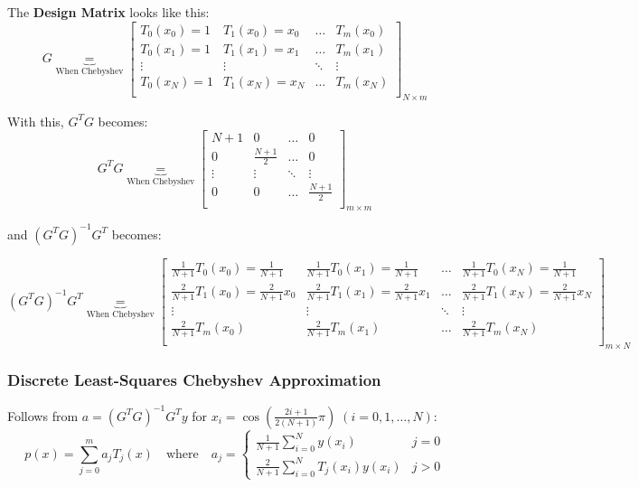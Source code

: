 \newpage

The \textbf{Design Matrix} looks like this:
$$G \underbrace{=}_{\text{When Chebyshev}}
\begin{bmatrix}
  T_0(x_0) = 1 & T_1(x_0) = x_0 & \ldots & T_m(x_0) \\
  T_0(x_1) = 1 & T_1(x_1) = x_1 & \ldots & T_m(x_1)\\
  \vdots & \vdots  & \ddots & \vdots\\
  T_0(x_N) = 1 & T_1(x_N) =x_N & \ldots & T_m(x_N)\\
\end{bmatrix}_{N \times m}$$

With this, $G^T G$ becomes:
$$G^T G \underbrace{=}_{\text{When Chebyshev}}
\begin{bmatrix}
  N+1 & 0 & \ldots & 0 \\
  0   & \frac{N+1}{2} & \ldots & 0\\
  \vdots  & \vdots & \ddots & \vdots\\
  0   & 0 & \ldots & \frac{N+1}{2}\\
\end{bmatrix}_{m \times m}$$

and $(G^T G)^{-1} G^T$ becomes:

$$(G^T G)^{-1} G^T \underbrace{=}_{\text{When Chebyshev}}
\begin{bmatrix}
  \frac{1}{N+1} T_0(x_0) = \frac{1}{N+1} & \frac{1}{N+1} T_0(x_1) = \frac{1}{N+1} & \ldots & \frac{1}{N+1} T_0(x_N) = \frac{1}{N+1} \\
  \frac{2}{N+1} T_1(x_0) = \frac{2}{N+1} x_0 & \frac{2}{N+1} T_1(x_1) = \frac{2}{N+1} x_1 & \ldots & \frac{2}{N+1} T_1(x_N) = \frac{2}{N+1}x_N\\
  \vdots & \vdots  & \ddots & \vdots\\
  \frac{2}{N+1} T_m(x_0) & \frac{2}{N+1} T_m(x_1) & \ldots & \frac{2}{N+1} T_m(x_N)\\
\end{bmatrix}_{m \times N}$$

\subsubsection{Discrete Least-Squares Chebyshev Approximation}
Follows from $a=(G^T G)^{-1} G^T y$ for $x_i=\cos(\frac{2i+1}{2(N+1)}\pi)\;(i=0,1,\ldots,N)$:
$$p(x) = \sum_{j=0}^m a_j T_j(x) \quad \text{where} \quad
a_j = \begin{cases}
  \frac{1}{N+1} \sum_{i=0}^N y(x_i) & j = 0\\
  \frac{2}{N+1} \sum_{i=0}^N T_j(x_i) y(x_i) & j > 0
\end{cases}$$

